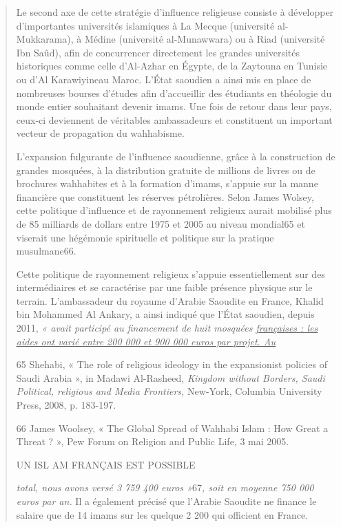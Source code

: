 \begin{quote}
Le second axe de cette stratégie d'influence religieuse consiste à
développer d'importantes universités islamiques à La Mecque (université
al-Mukkarama), à Médine (université al-Munawwara) ou à Riad (université
Ibn Saûd), afin de concurrencer directement les grandes universités
historiques comme celle d'Al-Azhar en Égypte, de la Zaytouna en Tunisie
ou d'Al Karawiyineau Maroc. L'État saoudien a ainsi mis en place de
nombreuses bourses d'études afin d'accueillir des étudiants en théologie
du monde entier souhaitant devenir imams. Une fois de retour dans leur
pays, ceux-ci deviennent de véritables ambassadeurs et constituent un
important vecteur de propagation du wahhabisme.

L'expansion fulgurante de l'influence saoudienne, grâce à la
construction de grandes mosquées, à la distribution gratuite de millions
de livres ou de brochures wahhabites et à la formation d'imams, s'appuie
sur la manne financière que constituent les réserves pétrolières. Selon
James Wolsey, cette politique d'influence et de rayonnement religieux
aurait mobilisé plus de 85 milliards de dollars entre 1975 et 2005 au
niveau mondial65 et viserait une hégémonie spirituelle et politique sur
la pratique musulmane66.

Cette politique de rayonnement religieux s'appuie essentiellement sur
des intermédiaires et se caractérise par une faible présence physique
sur le terrain. L'ambassadeur du royaume d'Arabie Saoudite en France,
Khalid bin Mohammed Al Ankary, a ainsi indiqué que l'État saoudien,
depuis 2011, \emph{« avait participé au financement de huit mosquées
\underline{françaises : les aides ont varié entre 200 000 et 900 000
euros par projet. Au}}

65 Shehabi, « The role of religious ideology in the expansionist
policies of Saudi Arabia », in Madawi Al-Rasheed, \emph{Kingdom without
Borders, Saudi Political, religious and Media Frontiers,} New-York,
Columbia University Press, 2008, p. 183-197.

66 James Woolsey, « The Global Spread of Wahhabi Islam : How Great a
Threat ? », Pew Forum on Religion and Public Life, 3 mai 2005.

UN ISL AM FRANÇAIS EST POSSIBLE

\emph{total, nous avons versé 3 759 400 euros »}67\emph{, soit en
moyenne 750 000 euros par an.} Il a également précisé que l'Arabie
Saoudite ne finance le salaire que de 14 imams sur les quelque 2 200 qui
officient en France.
\end{quote}

